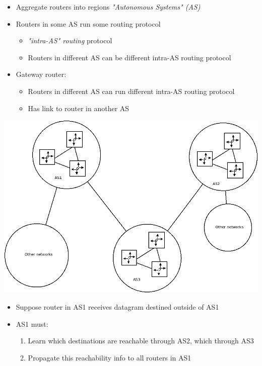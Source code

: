 \documentclass[11pt]{article}
\begin{document}
\begin{itemize}
\item Aggregate routers into regions \emph{"Autonomous Systems" (AS)}

\item Routers in some AS run some routing protocol
\begin{itemize}
\item \emph{"intra-AS" routing} protocol

\item Routers in different AS can be different intra-AS routing protocol
\end{itemize}

\item Gateway router:
\begin{itemize}
\item Routers in different AS can run different intra-AS routing protocol
\item Has link to router in another AS
\end{itemize}
\end{itemize}

\begin{center}
\includegraphics[width=.9\linewidth]{../img/autonomousSystems.png}
\end{center}

\begin{itemize}
\item Suppose router in AS1 receives datagram destined outside of AS1
\item AS1 must:
\begin{enumerate}
\item Learn which destinations are reachable through AS2, which through
AS3
\item Propagate this reachability info to all routers in AS1
\end{enumerate}
\end{itemize}
\end{document}

